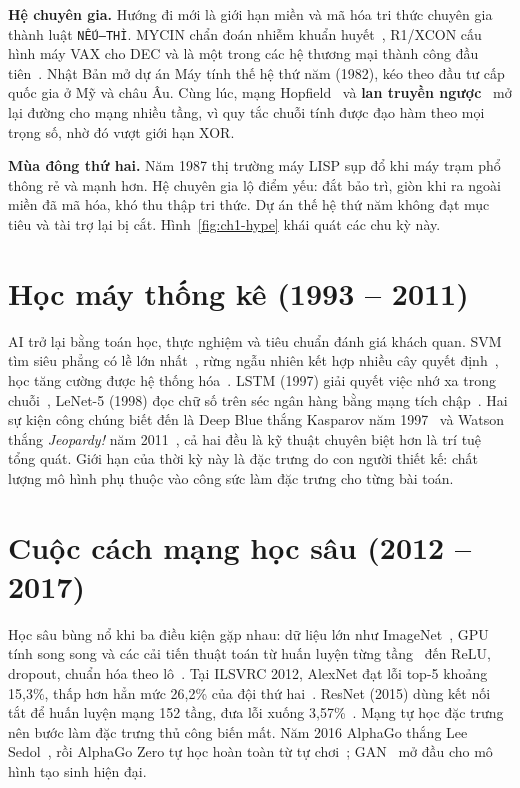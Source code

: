 \textbf{Hệ chuyên gia.} Hướng đi mới là giới hạn miền và mã hóa tri thức chuyên gia thành luật \texttt{NẾU--THÌ}. MYCIN chẩn đoán nhiễm
khuẩn huyết~\cite{ch1:shortliffe1976}, R1/XCON cấu hình máy VAX cho DEC và là một trong các hệ thương mại thành công đầu
tiên~\cite{ch1:mcdermott1982}. Nhật Bản mở dự án Máy tính thế hệ thứ năm (1982), kéo theo đầu tư cấp quốc gia ở Mỹ và châu Âu. Cùng lúc,
mạng Hopfield~\cite{ch1:hopfield1982} và \textbf{lan truyền ngược}~\cite{ch1:rumelhart1986} mở lại đường cho mạng nhiều tầng, vì quy
tắc chuỗi tính được đạo hàm theo mọi trọng số, nhờ đó vượt giới hạn XOR.

\textbf{Mùa đông thứ hai.} Năm 1987 thị trường máy LISP sụp đổ khi máy trạm phổ thông rẻ và mạnh hơn. Hệ chuyên gia lộ điểm yếu: đắt
bảo trì, giòn khi ra ngoài miền đã mã hóa, khó thu thập tri thức. Dự án thế hệ thứ năm không đạt mục tiêu và tài trợ lại bị cắt.
Hình~\ref{fig:ch1-hype} khái quát các chu kỳ này.


\section{Học máy thống kê (1993 -- 2011)}

AI trở lại bằng toán học, thực nghiệm và tiêu chuẩn đánh giá khách quan. SVM tìm siêu phẳng có lề lớn nhất~\cite{ch1:cortes1995}, rừng
ngẫu nhiên kết hợp nhiều cây quyết định~\cite{ch1:breiman2001}, học tăng cường được hệ thống hóa~\cite{ch1:sutton2018}. LSTM (1997) giải
quyết việc nhớ xa trong chuỗi~\cite{ch1:hochreiter1997}, LeNet-5 (1998) đọc chữ số trên séc ngân hàng bằng mạng tích chập~\cite{ch1:lecun1998}.
Hai sự kiện công chúng biết đến là Deep Blue thắng Kasparov năm 1997~\cite{ch1:campbell2002} và Watson thắng \emph{Jeopardy!} năm
2011~\cite{ch1:ferrucci2010}, cả hai đều là kỹ thuật chuyên biệt hơn là trí tuệ tổng quát. Giới hạn của thời kỳ này là đặc trưng do con người
thiết kế: chất lượng mô hình phụ thuộc vào công sức làm đặc trưng cho từng bài toán.

\section{Cuộc cách mạng học sâu (2012 -- 2017)}

Học sâu bùng nổ khi ba điều kiện gặp nhau: dữ liệu lớn như ImageNet~\cite{ch1:deng2009}, GPU tính song song và các cải tiến thuật toán từ
huấn luyện từng tầng~\cite{ch1:hinton2006} đến ReLU, dropout, chuẩn hóa theo lô~\cite{ch1:lecun2015}. Tại ILSVRC 2012, AlexNet đạt lỗi top-5
khoảng 15,3\%, thấp hơn hẳn mức 26,2\% của đội thứ hai~\cite{ch1:krizhevsky2012}. ResNet (2015) dùng kết nối tắt để huấn luyện mạng 152
tầng, đưa lỗi xuống 3,57\%~\cite{ch1:he2016}. Mạng tự học đặc trưng nên bước làm đặc trưng thủ công biến mất. Năm 2016 AlphaGo thắng Lee
Sedol~\cite{ch1:silver2016}, rồi AlphaGo Zero tự học hoàn toàn từ tự chơi~\cite{ch1:silver2017}; GAN~\cite{ch1:goodfellow2014} mở đầu cho mô
hình tạo sinh hiện đại.

